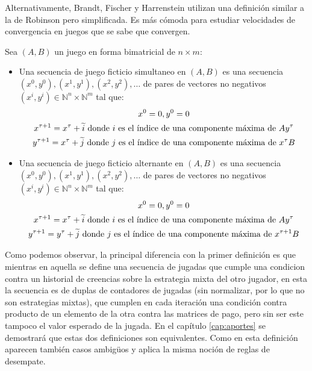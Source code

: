 Alternativamente, Brandt, Fischer y Harrenstein utilizan una definición similar a la de Robinson \cite{robinson:zerosum} pero simplificada. Es más cómoda para estudiar velocidades de convergencia en juegos que se sabe que convergen.

\begin{definition} \label{def:fp:brandt}
    Sea $(A, B)$ un juego en forma bimatricial de $n \times m$:
    \begin{itemize}
        \item Una secuencia de juego ficticio simultaneo en $(A, B)$ es una secuencia $(x^0, y^0), (x^1, y^1), (x^2, y^2), \dots$ de pares de vectores no negativos $(x^i, y^i) \in \mathbb{N}^n \times \mathbb{N}^m$ tal que:
        \begin{gather*}
            x^0 = \boldmath{0}, y^0 = \boldmath{0} \\
            x^{\tau+1} = x^{\tau} + \widetilde{i} \text{\ donde $i$ es el índice de una componente máxima de $Ay^\tau$} \\
            y^{\tau+1} = x^{\tau} + \widetilde{j} \text{\ donde $j$ es el índice de una componente máxima de $x^{\tau}B$}
        \end{gather*}
        \item Una secuencia de juego ficticio alternante en $(A, B)$ es una secuencia $(x^0, y^0), (x^1, y^1), (x^2, y^2), \dots$ de pares de vectores no negativos $(x^i, y^i) \in \mathbb{N}^n \times \mathbb{N}^m$ tal que:
        \begin{gather*}
            x^0 = \boldmath{0}, y^0 = \boldmath{0} \\
            x^{\tau+1} = x^{\tau} + \widetilde{i} \text{\ donde $i$ es el índice de una componente máxima de $Ay^\tau$} \\
            y^{\tau+1} = y^{\tau} + \widetilde{j} \text{\ donde $j$ es el índice de una componente máxima de $x^{\tau+1}B$}
        \end{gather*}
    \end{itemize}
\end{definition}

Como podemos observar, la principal diferencia con la primer definición es que mientras en aquella se define una secuencia de jugadas que cumple una condicion contra un historial de creencias sobre la estrategia mixta del otro jugador, en esta la secuencia es de duplas de contadores de jugadas (sin normalizar, por lo que no son estrategias mixtas), que cumplen en cada iteración una condición contra producto de un elemento de la otra contra las matrices de pago, pero sin ser este tampoco el valor esperado de la jugada. En el capítulo \ref{cap:aportes} se demostrará que estas dos definiciones son equivalentes. Como en esta definición aparecen también casos ambigüos y aplica la misma noción de reglas de desempate.

